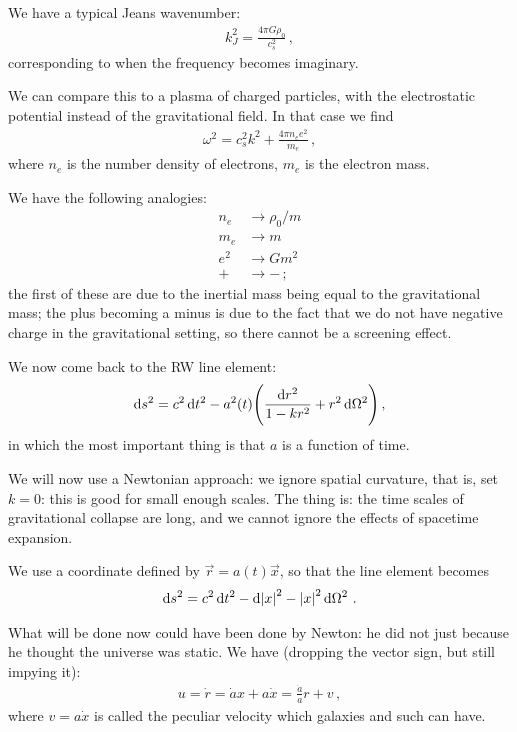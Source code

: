 \documentclass[main.tex]{subfiles}
\begin{document}
We have a typical Jeans wavenumber: 
%
\begin{align}
  k_J^2 = \frac{4 \pi G \rho_0 }{c_s^2}
\,,
\end{align}
%
corresponding to when the frequency becomes imaginary. 

We can compare this to a plasma of charged particles, with the electrostatic potential instead of the gravitational field. 
In that case we find 
%
\begin{align}
  \omega^2 = c_s^2 k^2 + \frac{4 \pi n_e e^2}{m_e}
\,,
\end{align}
%
where \(n_e\) is the number density of electrons, \(m_e\) is the electron mass. 

We have the following analogies: 
%
\begin{subequations}
\begin{align}
  n_e &\rightarrow \rho_0 / m  \\
  m_e &\rightarrow m  \\
  e^2 &\rightarrow Gm^2  \\
  + &\rightarrow -
\,;
\end{align}
\end{subequations}
%
the first of these are due to the inertial mass being equal to the gravitational mass; the plus becoming a minus is due to the fact that we do not have negative charge in the gravitational setting, so there cannot be a screening effect. 

We now come back to the RW line element: 
%
\begin{align}
  \dd{s^2} = c^2 \dd{t^2} 
  -a^2(t) \qty(\frac{ \dd{r^2}}{1 - kr^2} + r^2 \dd{\Omega^2})
\,,
\end{align}
%
in which the most important thing is that \(a\) is a function of time. 

We will now use a Newtonian approach: we ignore spatial curvature, that is, set \(k=0\): this is good for small enough scales. The thing is: the time scales of gravitational collapse are long, and we cannot ignore the effects of spacetime expansion. 

We use a coordinate defined by \(\vec{r} = a(t) \vec{x}\), so that the line element becomes 
%
\begin{align}
  \dd{s^2} = c^2 \dd{t^2} - \dd{\abs{x}^2} - 
\abs{x}^2 \dd{\Omega^2}
\,. 
\end{align}
%

What will be done now could have been done by Newton: he did not just because he thought the universe was static. We have (dropping the vector sign, but still impying it): 
%
\begin{align}
  u = \dot{r} = \dot{a} x + a \dot{x} 
  = \frac{\dot{a}}{a} r + v
\,,
\end{align}
%
where \(v = a \dot{x}\) is called the peculiar velocity which galaxies and such can have.  
\end{document}
